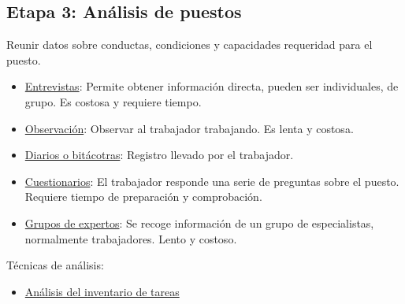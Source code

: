 \subsection{Etapa 3: Análisis de puestos}
Reunir datos sobre conductas, condiciones y capacidades requeridad para el puesto.
\begin{itemize}
    \item \underline{Entrevistas}: Permite obtener información directa, pueden ser individuales, de grupo. Es costosa y requiere tiempo.
    \item \underline{Observación}: Observar al trabajador trabajando. Es lenta y costosa.
    \item \underline{Diarios o bitácotras}: Registro llevado por el trabajador.
    \item \underline{Cuestionarios}: El trabajador responde una serie de preguntas sobre el puesto. Requiere tiempo de preparación y comprobación.
    \item \underline{Grupos de expertos}: Se recoge información de un grupo de especialistas, normalmente trabajadores. Lento y costoso.
\end{itemize}

Técnicas de análisis:
\begin{itemize}
    \item \underline{Análisis del inventario de tareas}
\end{itemize}
